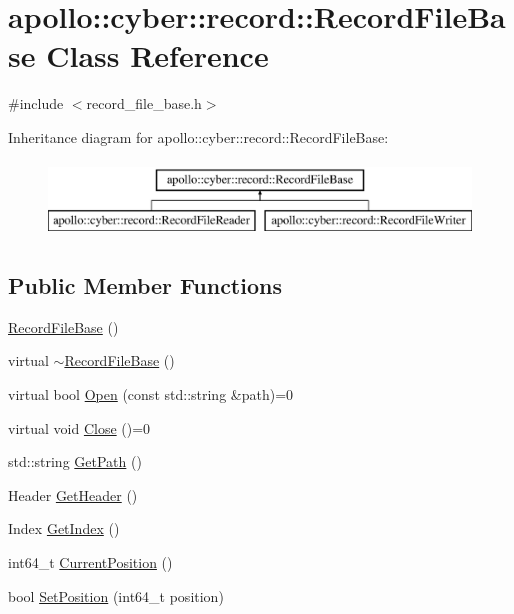 \hypertarget{classapollo_1_1cyber_1_1record_1_1RecordFileBase}{\section{apollo\-:\-:cyber\-:\-:record\-:\-:Record\-File\-Base Class Reference}
\label{classapollo_1_1cyber_1_1record_1_1RecordFileBase}
}


{\ttfamily \#include $<$record\-\_\-file\-\_\-base.\-h$>$}

Inheritance diagram for apollo\-:\-:cyber\-:\-:record\-:\-:Record\-File\-Base\-:\begin{figure}[H]
\begin{center}
\leavevmode
\includegraphics[height=2.000000cm]{classapollo_1_1cyber_1_1record_1_1RecordFileBase}
\end{center}
\end{figure}
\subsection*{Public Member Functions}
\begin{DoxyCompactItemize}
\item 
\hyperlink{classapollo_1_1cyber_1_1record_1_1RecordFileBase_a4c7d2cb39c253bdf313cdc3b6cfce6f7}{Record\-File\-Base} ()
\item 
virtual \hyperlink{classapollo_1_1cyber_1_1record_1_1RecordFileBase_a1301fc8aeff24f24923230756a3a4f43}{$\sim$\-Record\-File\-Base} ()
\item 
virtual bool \hyperlink{classapollo_1_1cyber_1_1record_1_1RecordFileBase_a9128d7ad36b3331d21e0eae475632892}{Open} (const std\-::string \&path)=0
\item 
virtual void \hyperlink{classapollo_1_1cyber_1_1record_1_1RecordFileBase_a6792f98d27bf7e3d4557156122bd43ab}{Close} ()=0
\item 
std\-::string \hyperlink{classapollo_1_1cyber_1_1record_1_1RecordFileBase_a2e9b0a25e5056a50f9b305ce52ec56cc}{Get\-Path} ()
\item 
Header \hyperlink{classapollo_1_1cyber_1_1record_1_1RecordFileBase_a0b740c127e82868252be11c579a0f37d}{Get\-Header} ()
\item 
Index \hyperlink{classapollo_1_1cyber_1_1record_1_1RecordFileBase_ae9213e1fa4c6aff79e59b5011b2232b2}{Get\-Index} ()
\item 
int64\-\_\-t \hyperlink{classapollo_1_1cyber_1_1record_1_1RecordFileBase_ae9ab782e3a023c522ccb2de275622559}{Current\-Position} ()
\item 
bool \hyperlink{classapollo_1_1cyber_1_1record_1_1RecordFileBase_a5349dcfbdbc71a784e7eef98504c04ea}{Set\-Position} (int64\-\_\-t position)
\end{DoxyCompactItemize}
